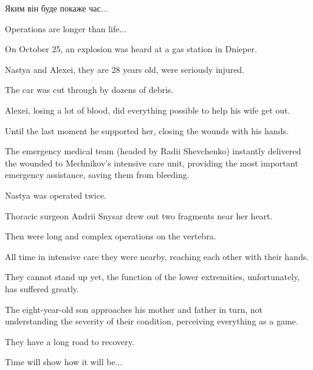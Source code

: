 Яким він буде покаже час...

Operations are longer than life...

On October 25, an explosion was heard at a gas station in Dnieper.

Nastya and Alexei, they are 28 years old, were seriously injured.

The car was cut through by dozens of debris.

Alexei, losing a lot of blood, did everything possible to help his wife get
out.

Until the last moment he supported her, closing the wounds with his hands.

The emergency medical team (headed by Radii Shevchenko) instantly delivered the
wounded to Mechnikov's intensive care unit, providing the most important
emergency assistance, saving them from bleeding.

Nastya was operated twice.

Thoracic surgeon Andrii Snysar drew out two fragments near her heart.

Then were long and complex operations on the vertebra. 

All time in intensive care they were nearby, reaching each other with their
hands.

They cannot stand up yet, the function of the lower extremities, unfortunately,
has suffered greatly.

The eight-year-old son approaches his mother and father in turn, not
understanding the severity of their condition, perceiving everything as a game.

They have a long road to recovery.

Time will show how it will be...
